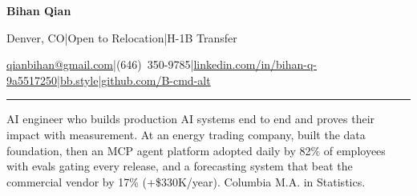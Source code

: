 \documentclass[letterpaper]{article}
\newcommand{\sep}{\enspace|\enspace}
\newcommand{\heading}[1]{\addvspace{4.5bp}{\fontsize{11bp}{13bp}\selectfont\bfseries#1\par}
  \vspace{3.5bp}\hrule\vspace{5bp}}
\begin{document}
\fontsize{10bp}{13bp}\selectfont

{\centering
{\fontsize{20bp}{24bp}\selectfont\bfseries Bihan Qian\par}
\vspace{3bp}
{\fontsize{8.5bp}{11bp}\selectfont Denver, CO\sep Open to Relocation\sep H-1B Transfer\par
\href{mailto:qianbihan@gmail.com}{qianbihan@gmail.com}\sep(646)~350-9785\sep\href{https://www.linkedin.com/in/bihan-q-9a5517250}{linkedin.com/in/bihan-q-9a5517250}\sep\href{https://bb.style/}{bb.style}\sep\href{https://github.com/B-cmd-alt}{github.com/B-cmd-alt}\par}}

\heading{SUMMARY}
AI engineer who builds production AI systems end to end and proves their impact with measurement. At an energy trading company, built the data foundation, then an MCP agent platform adopted daily by 82\% of employees with evals gating every release, and a forecasting system that beat the commercial vendor by 17\% (+\$330K/year). Columbia M.A. in Statistics.\par
\end{document}
